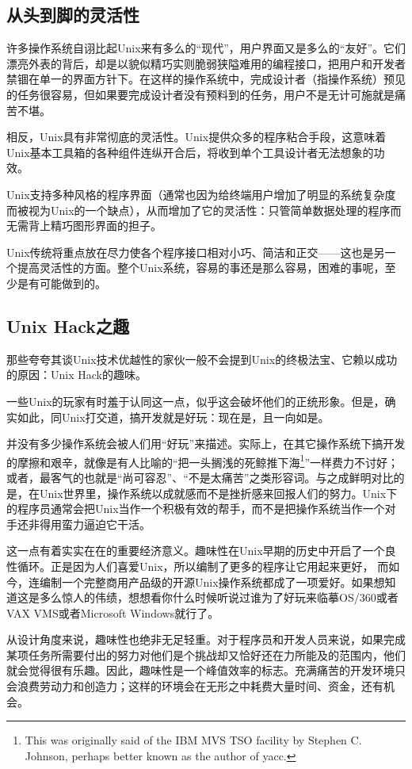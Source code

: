 \documentclass[12pt,oneside]{book}
\begin{document}
\begin{common-format}
\subsection{从头到脚的灵活性}
许多操作系统自诩比起Unix来有多么的“现代”，用户界面又是多么的“友好”。它们漂亮外表的背后，却是以貌似精巧实则脆弱狭隘难用的编程接口，把用户和开发者禁锢在单一的界面方针下。在这样的操作系统中，完成设计者（指操作系统）预见的任务很容易，但如果要完成设计者没有预料到的任务，用户不是无计可施就是痛苦不堪。

相反，Unix具有非常彻底的灵活性。Unix提供众多的程序粘合手段，这意味着Unix基本工具箱的各种组件连纵开合后，将收到单个工具设计者无法想象的功效。

Unix支持多种风格的程序界面（通常也因为给终端用户增加了明显的系统复杂度而被视为Unix的一个缺点），从而增加了它的灵活性：只管简单数据处理的程序而无需背上精巧图形界面的担子。

Unix传统将重点放在尽力使各个程序接口相对小巧、简洁和正交——这也是另一个提高灵活性的方面。整个Unix系统，容易的事还是那么容易，困难的事呢，至少是有可能做到的。

\subsection{Unix Hack之趣}
那些夸夸其谈Unix技术优越性的家伙一般不会提到Unix的终极法宝、它赖以成功的原因：Unix Hack的趣味。

一些Unix的玩家有时羞于认同这一点，似乎这会破坏他们的正统形象。但是，确实如此，同Unix打交道，搞开发就是好玩：现在是，且一向如是。

并没有多少操作系统会被人们用“好玩”来描述。实际上，在其它操作系统下搞开发的摩擦和艰辛，就像是有人比喻的“把一头搁浅的死鲸推下海\footnote{This was originally said of the IBM MVS TSO facility by Stephen C. Johnson, perhaps better known as the author of yacc.}”一样费力不讨好；或者，最客气的也就是“尚可容忍”、“不是太痛苦”之类形容词。与之成鲜明对比的是，在Unix世界里，操作系统以成就感而不是挫折感来回报人们的努力。Unix下的程序员通常会把Unix当作一个积极有效的帮手，而不是把操作系统当作一个对手还非得用蛮力逼迫它干活。

这一点有着实实在在的重要经济意义。趣味性在Unix早期的历史中开启了一个良性循环。正是因为人们喜爱Unix，所以编制了更多的程序让它用起来更好，  而如今，连编制一个完整商用产品级的开源Unix操作系统都成了一项爱好。如果想知道这是多么惊人的伟绩，想想看你什么时候听说过谁为了好玩来临摹OS/360或者VAX VMS或者Microsoft Windows就行了。

从设计角度来说，趣味性也绝非无足轻重。对于程序员和开发人员来说，如果完成某项任务所需要付出的努力对他们是个挑战却又恰好还在力所能及的范围内，他们就会觉得很有乐趣。因此，趣味性是一个峰值效率的标志。充满痛苦的开发环境只会浪费劳动力和创造力；这样的环境会在无形之中耗费大量时间、资金，还有机会。


\end{common-format}
\end{document}
